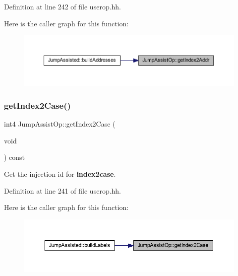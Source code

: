 Definition at line 242 of file userop.\+hh.

Here is the caller graph for this function\+:
\nopagebreak
\begin{figure}[H]
\begin{center}
\leavevmode
\includegraphics[width=350pt]{class_jump_assist_op_ae4b341a772a139b06c20f52262d35adb_icgraph}
\end{center}
\end{figure}
\mbox{\label{class_jump_assist_op_a9bd801baba290c5a6dab5455dd1d946e}} 
\subsubsection{\texorpdfstring{getIndex2Case()}{getIndex2Case()}}
{\footnotesize\ttfamily int4 Jump\+Assist\+Op\+::get\+Index2\+Case (\begin{DoxyParamCaption}\item[{void}]{ }\end{DoxyParamCaption}) const\hspace{0.3cm}{\ttfamily [inline]}}



Get the injection id for {\bfseries{index2case}}. 



Definition at line 241 of file userop.\+hh.

Here is the caller graph for this function\+:
\nopagebreak
\begin{figure}[H]
\begin{center}
\leavevmode
\includegraphics[width=350pt]{class_jump_assist_op_a9bd801baba290c5a6dab5455dd1d946e_icgraph}
\end{center}
\end{figure}
\mbox{\label{class_jump_assist_op_a2e246c75988410d0fbdae74e44eb09cc}} 
